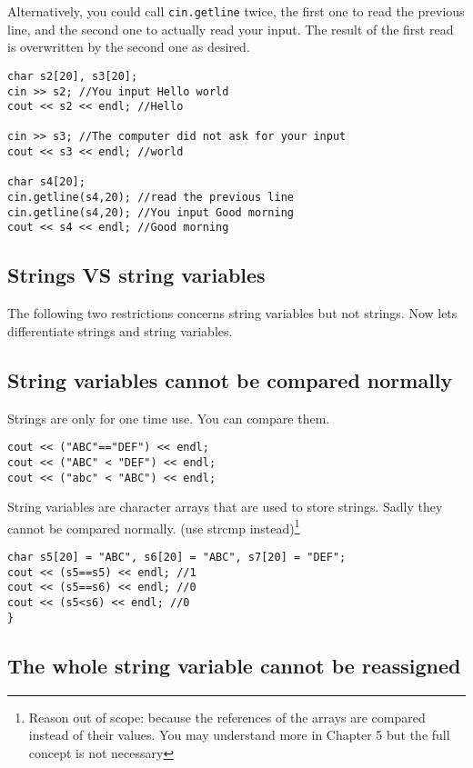 Alternatively, you could call \texttt{cin.getline} twice, the first one to read the previous line, and the second one to actually read your input. The result of the first read is overwritten by the second one as desired.

\begin{lstlisting}
char s2[20], s3[20];
cin >> s2; //You input Hello world
cout << s2 << endl; //Hello

cin >> s3; //The computer did not ask for your input
cout << s3 << endl; //world

char s4[20];
cin.getline(s4,20); //read the previous line
cin.getline(s4,20); //You input Good morning
cout << s4 << endl; //Good morning
\end{lstlisting}

\subsection{Strings VS string variables}

The following two restrictions concerns string variables but not strings. Now lets differentiate strings and string variables.

\subsection*{String variables cannot be compared normally}

Strings are only for one time use. You can compare them.

\begin{lstlisting}
cout << ("ABC"=="DEF") << endl;
cout << ("ABC" < "DEF") << endl;
cout << ("abc" < "ABC") << endl;
\end{lstlisting}

String variables are character arrays that are used to store strings. Sadly they cannot be compared normally. (use strcmp instead)\footnote{Reason out of scope: because the references of the arrays are compared instead of their values. You may understand more in Chapter 5 but the full concept is not necessary}

\begin{lstlisting}
char s5[20] = "ABC", s6[20] = "ABC", s7[20] = "DEF";
cout << (s5==s5) << endl; //1
cout << (s5==s6) << endl; //0
cout << (s5<s6) << endl; //0
}
\end{lstlisting}

\subsection*{The whole string variable cannot be reassigned}

